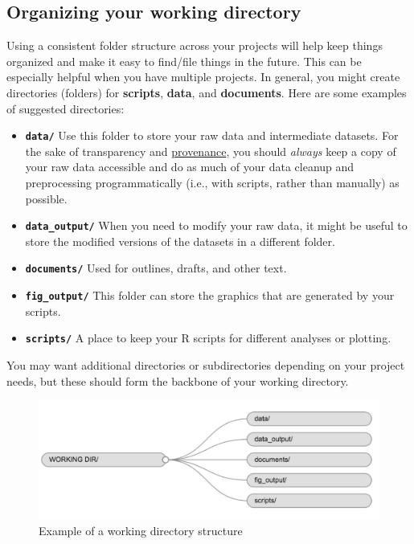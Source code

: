 \documentclass[]{book}
\providecommand{\tightlist}{%
  \setlength{\itemsep}{0pt}\setlength{\parskip}{0pt}}
\begin{document}
\subsection{Organizing your working
directory}\label{organizing-your-working-directory}

Using a consistent folder structure across your projects will help keep
things organized and make it easy to find/file things in the future.
This can be especially helpful when you have multiple projects. In
general, you might create directories (folders) for \textbf{scripts},
\textbf{data}, and \textbf{documents}. Here are some examples of
suggested directories:

\begin{itemize}
\tightlist
\item
  \textbf{\texttt{data/}} Use this folder to store your raw data and
  intermediate datasets. For the sake of transparency and
  \href{https://en.wikipedia.org/wiki/Provenance}{provenance}, you
  should \emph{always} keep a copy of your raw data accessible and do as
  much of your data cleanup and preprocessing programmatically (i.e.,
  with scripts, rather than manually) as possible.
\item
  \textbf{\texttt{data\_output/}} When you need to modify your raw data,
  it might be useful to store the modified versions of the datasets in a
  different folder.
\item
  \textbf{\texttt{documents/}} Used for outlines, drafts, and other
  text.
\item
  \textbf{\texttt{fig\_output/}} This folder can store the graphics that
  are generated by your scripts.
\item
  \textbf{\texttt{scripts/}} A place to keep your R scripts for
  different analyses or plotting.
\end{itemize}

You may want additional directories or subdirectories depending on your
project needs, but these should form the backbone of your working
directory.

\begin{figure}
\centering
\includegraphics{../fig/working-directory-structure.png}
\caption{Example of a working directory structure}
\end{figure}
\end{document}
